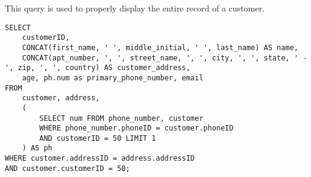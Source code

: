 This query is used to properly display the entire record of a customer.

\begin{lstlisting}
SELECT
    customerID,
    CONCAT(first_name, ' ', middle_initial, ' ', last_name) AS name,
    CONCAT(apt_number, ', ', street_name, ', ', city, ', ', state, ' - ', zip, ', ', country) AS customer_address,
    age, ph.num as primary_phone_number, email
FROM
    customer, address,
    (
        SELECT num FROM phone_number, customer
        WHERE phone_number.phoneID = customer.phoneID
        AND customerID = 50 LIMIT 1
    ) AS ph
WHERE customer.addressID = address.addressID
AND customer.customerID = 50;
\end{lstlisting}